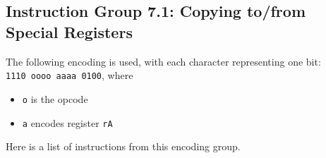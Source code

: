 \documentclass{article}
\begin{document}
	\subsection{Instruction Group 7.1:  Copying to/from Special Registers}
	The following encoding is used, with each character representing one
	bit:  \\
	\texttt{1110 oooo aaaa 0100}, where

	\singlespacing
	\begin{itemize}
		\item \texttt{o} is the opcode
		\item \texttt{a} encodes register \texttt{rA}
	\end{itemize}
	\doublespacing

	Here is a list of instructions from this encoding group.
\end{document}
